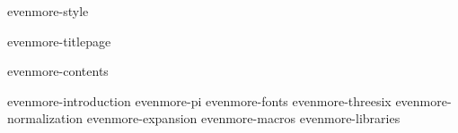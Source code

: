\environment evenmore-style

\dontcomplain

\startdocument

    \component evenmore-titlepage

    \startfrontmatter
        \component evenmore-contents
    \stopfrontmatter

    \startbodymatter
        \component evenmore-introduction
        \component evenmore-pi
        \component evenmore-fonts
        \component evenmore-threesix
        \component evenmore-normalization
        \component evenmore-expansion
        \component evenmore-macros
        \component evenmore-libraries
    \stopbodymatter

\stopdocument
